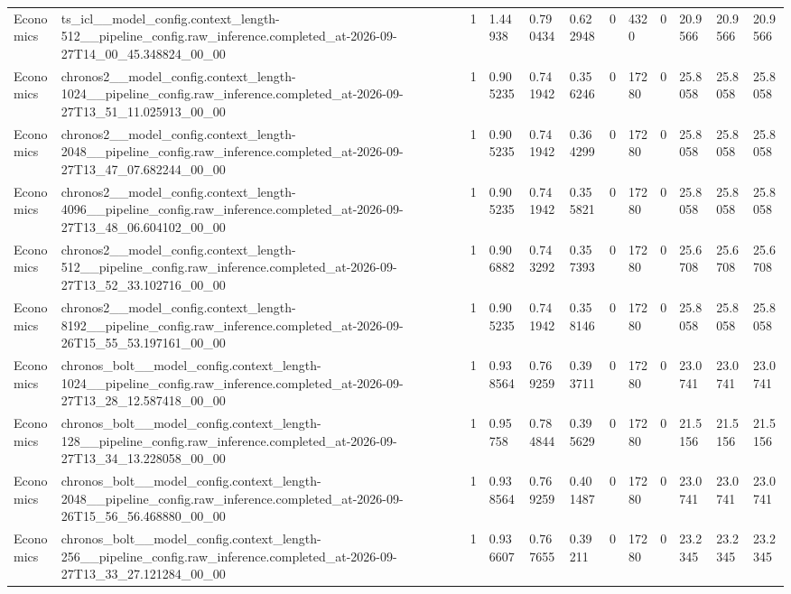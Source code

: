 \begin{tabular}{llllllllllll}
Economics & ts\_icl\_\_model\_config.context\_length-512\_\_pipeline\_config.raw\_inference.completed\_at-2026-09-27T14\_00\_45.348824\_00\_00 & 1 & 1.44938 & 0.790434 & 0.622948 & 0 & 4320 & 0 & 20.9566 & 20.9566 & 20.9566 \\
Economics & chronos2\_\_model\_config.context\_length-1024\_\_pipeline\_config.raw\_inference.completed\_at-2026-09-27T13\_51\_11.025913\_00\_00 & 1 & 0.905235 & 0.741942 & 0.356246 & 0 & 17280 & 0 & 25.8058 & 25.8058 & 25.8058 \\
Economics & chronos2\_\_model\_config.context\_length-2048\_\_pipeline\_config.raw\_inference.completed\_at-2026-09-27T13\_47\_07.682244\_00\_00 & 1 & 0.905235 & 0.741942 & 0.364299 & 0 & 17280 & 0 & 25.8058 & 25.8058 & 25.8058 \\
Economics & chronos2\_\_model\_config.context\_length-4096\_\_pipeline\_config.raw\_inference.completed\_at-2026-09-27T13\_48\_06.604102\_00\_00 & 1 & 0.905235 & 0.741942 & 0.355821 & 0 & 17280 & 0 & 25.8058 & 25.8058 & 25.8058 \\
Economics & chronos2\_\_model\_config.context\_length-512\_\_pipeline\_config.raw\_inference.completed\_at-2026-09-27T13\_52\_33.102716\_00\_00 & 1 & 0.906882 & 0.743292 & 0.357393 & 0 & 17280 & 0 & 25.6708 & 25.6708 & 25.6708 \\
Economics & chronos2\_\_model\_config.context\_length-8192\_\_pipeline\_config.raw\_inference.completed\_at-2026-09-26T15\_55\_53.197161\_00\_00 & 1 & 0.905235 & 0.741942 & 0.358146 & 0 & 17280 & 0 & 25.8058 & 25.8058 & 25.8058 \\
Economics & chronos\_bolt\_\_model\_config.context\_length-1024\_\_pipeline\_config.raw\_inference.completed\_at-2026-09-27T13\_28\_12.587418\_00\_00 & 1 & 0.938564 & 0.769259 & 0.393711 & 0 & 17280 & 0 & 23.0741 & 23.0741 & 23.0741 \\
Economics & chronos\_bolt\_\_model\_config.context\_length-128\_\_pipeline\_config.raw\_inference.completed\_at-2026-09-27T13\_34\_13.228058\_00\_00 & 1 & 0.95758 & 0.784844 & 0.395629 & 0 & 17280 & 0 & 21.5156 & 21.5156 & 21.5156 \\
Economics & chronos\_bolt\_\_model\_config.context\_length-2048\_\_pipeline\_config.raw\_inference.completed\_at-2026-09-26T15\_56\_56.468880\_00\_00 & 1 & 0.938564 & 0.769259 & 0.401487 & 0 & 17280 & 0 & 23.0741 & 23.0741 & 23.0741 \\
Economics & chronos\_bolt\_\_model\_config.context\_length-256\_\_pipeline\_config.raw\_inference.completed\_at-2026-09-27T13\_33\_27.121284\_00\_00 & 1 & 0.936607 & 0.767655 & 0.39211 & 0 & 17280 & 0 & 23.2345 & 23.2345 & 23.2345 \\

\end{tabular}
